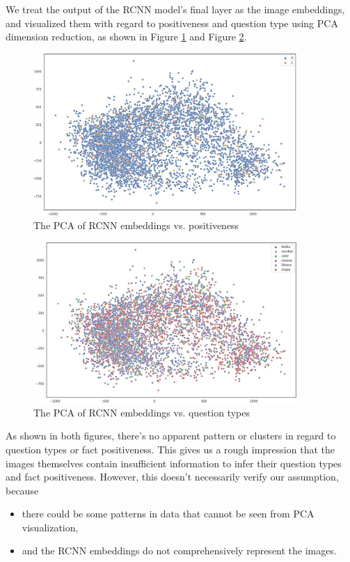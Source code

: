 \documentclass[nohyperref]{article}
\theoremstyle{plain}
\theoremstyle{definition}
\theoremstyle{remark}
\begin{document}
    We treat the output of the RCNN model's final layer as the image embeddings, and visualized them with regard to
    positiveness and question type using PCA dimension reduction, as shown in Figure \ref{fig:rcnn_embed_vs_pos_neg} and
    Figure \ref{fig:rcnn_embed_vs_qcate}.

    \begin{figure}[h]
        \includegraphics[width=10cm]{rcnn_embed_vs_pos_neg}
        \caption{The PCA of RCNN embeddings vs. positiveness}
        \label{fig:rcnn_embed_vs_pos_neg}
    \end{figure}

    \begin{figure}[h]
        \includegraphics[width=10cm]{rcnn_embed_vs_qcate}
        \caption{The PCA of RCNN embeddings vs. question types}
        \label{fig:rcnn_embed_vs_qcate}
    \end{figure}

    As shown in both figures, there's no apparent pattern or clusters in regard to question types or fact positiveness.
    This gives us a rough impression that the images themselves contain insufficient information to infer their question
    types and fact positiveness.
    However, this doesn't necessarily verify our assumption, because
    \begin{itemize}
        \item there could be some patterns in data that cannot be seen from PCA visualization,
        \item and the RCNN embeddings do not comprehensively represent the images.
    \end{itemize}
\end{document}
